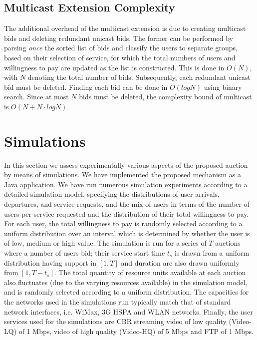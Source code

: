 \documentclass[a4paper]{article}
\begin{document}
\subsection{Multicast Extension Complexity}
The additional overhead of the multicast extension is due to creating
multicast bids and deleting redundant unicast bids. The former can be
performed 
by parsing {\em once} the sorted list of bids and
classify the users to separate groups, based on their selection of service,
for which the total numbers of users and willingness to pay are updated 
as the list is constructed. This is done in $O(N)$, with $N$ denoting the 
total number of bids. Subsequently, each redundant unicast bid must be 
deleted. Finding each bid can be done in $O(logN)$ using binary search. 
Since at most $N$ bids must be deleted, the complexity bound of 
multicast is $O(N + N \cdot logN)$.
 
\section{Simulations}\label{sec:sims}

In this section we assess experimentally various aspects of the 
proposed auction  by means of simulations. We have implemented
the proposed mechanism as a Java application. 
We have run numerous simulation experiments according to 
a detailed simulation model, specifying the distributions of 
user arrivals, departures, and service requests, and the mix
of users in terms of the number of users per service requested and the
distribution of their total willingness to pay.
For each user, the total willingness to pay is randomly selected according 
to a uniform distribution over an interval which is determined by 
whether the user is of low, medium or high value. 
The simulation is run for a series of $T$ auctions where a
number of users bid; their service start time $t_s$ is drawn from 
a uniform distribution having support in $[1, T]$ and duration
are also drawn uniformly from $[1, T-t_s]$.
The total quantity of resource units available at 
each auction also fluctuates (due to the varying 
resources available) in the simulation model, 
and is randomly selected according to a uniform distribution. 
The capacities for the networks used in the simulations run typically 
match that of standard network interfaces, i.e. WiMax, 3G HSPA and 
WLAN networks. Finally, the user services used for the simulations
are CBR streaming video of low quality (Video-LQ) of 1 Mbps, video of
high quality (Video-HQ) of 5 Mbps and FTP of 1 Mbps.
\end{document}
